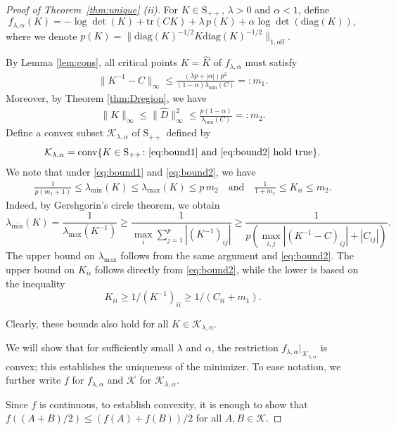 \documentclass[12pt]{amsart}
\numberwithin{equation}{section}
\numberwithin{equation}{section}
\theoremstyle{plain}
\theoremstyle{definition}
\newcommand{\tr}{\mathrm{tr}}
\newcommand{\diag}[1]{\mathrm{diag}(#1)}
\newcommand{\Spp}{\mathrm{S}_{++}}
\begin{document}
\begin{proof}[Proof of Theorem~\ref{thm:unique} (ii)]
 For $K\in\Spp$, $\lambda>0$ and $\alpha<1$, define 
\[
f_{\lambda,\alpha}(K) = -\log\det(K)+\tr(C K) + \lambda\, p(K)+ \alpha \log \det(\diag{K}),
\]
where we denote $p(K) = \| \diag{K}^{-1/2}K\diag{K}^{-1/2}\|_{1,\mathrm{off}}$.

By Lemma \ref{lem:cons}, all critical points $K=\hat{K}$ of $f_{\lambda,\alpha}$ must satisfy
\begin{align}\label{eq:bound1}
\| K^{-1}-C\|_\infty  \leq  \frac{(\lambda p +|\alpha|)p^2}{(1-\alpha)\lambda_{\min}(C)}=:m_1.
\end{align}
Moreover, by Theorem \ref{thm:Dregion}, we have 
\begin{align}\label{eq:bound2}
\|K\|_\infty \leq \|\hat{D}\|_\infty^2 \leq \frac{p(1-\alpha)}{\lambda_{\min}(C)}=:m_2.
\end{align}
Define a convex subset $\mathcal{K}_{\lambda,\alpha}$ of $\Spp$ defined by
\[
\mathcal{K}_{\lambda,\alpha} = \mathrm{conv}\{ K\in\Spp\colon  \eqref{eq:bound1}\mbox{ and }\eqref{eq:bound2} \mbox{ hold true}\}.
\]
We note that under \eqref{eq:bound1} and \eqref{eq:bound2}, we have 
\begin{align*}
\frac{1}{p(m_1+1)} \leq \lambda_{\min}(K)\leq \lambda_{\max}(K)\leq p \,m_2\quad\mbox{and}\quad \frac{1}{1+m_1}\leq K_{ii}\leq m_2. 
\end{align*}
Indeed, by Gershgorin's circle theorem, we obtain
\[
\lambda_{\min}(K) = \frac{1}{\lambda_{\max}(K^{-1})} \geq \frac{1}{\max_i \sum_{j=1}^p |(K^{-1})_{ij}|} \geq \frac{1}{p (\max_{i,j} |(K^{-1}-C)_{ij}| + |C_{ij}|)}. 
\]
The upper bound on $\lambda_{\max}$ follows from the same argument and \eqref{eq:bound2}. 
The upper bound on $K_{ii}$ follows directly from \eqref{eq:bound2}, while the lower is based on the inequality 
\[
K_{ii} \geq 1/(K^{-1})_{ii} \geq 1/(C_{ii}+m_1). 
\]

Clearly, these bounds also hold for all $K\in\mathcal{K}_{\lambda,\alpha}$.

We will show that for sufficiently small $\lambda$ and $\alpha$, the restriction $f_{\lambda,\alpha}\big|_{\mathcal{K}_{\lambda,\alpha}}$ is convex; this establishes the uniqueness of the  minimizer. 
To ease notation, we further write $f$ for $f_{\lambda,\alpha}$ and $\mathcal{K}$ for $\mathcal{K}_{\lambda,\alpha}$. 

Since $f$ is continuous, to establish convexity, it is enough to show that $f( (A+B)/2)\leq (f(A)+f(B))/2$ for all $A,B\in\mathcal{K}$. 


\end{proof}
\end{document}
